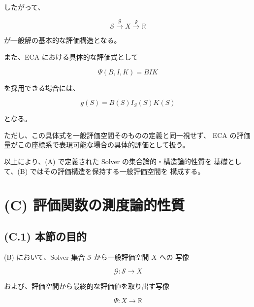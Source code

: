 \documentclass[a4paper,11pt]{article}
\newcommand{\Solver}{\mathcal{S}}
\newcommand{\R}{\mathbb{R}}
\begin{document}
したがって、

\begin{equation}
    \boxed{
        \Solver
        \xrightarrow{\mathcal{G}}
        X
        \xrightarrow{\Psi}
        \R
    }
\end{equation}

が一般解の基本的な評価構造となる。

また、ECA における具体的な評価式として

\begin{equation}
    \Psi(B,I,K)=BIK
\end{equation}

を採用できる場合には、

\begin{equation}
    g(S)
    =
    B(S)I_S(S)K(S)
\end{equation}

となる。

ただし、この具体式を一般評価空間そのものの定義と同一視せず、
ECA の評価量がこの座標系で表現可能な場合の具体的評価として扱う。

以上により、(A) で定義された Solver の集合論的・構造論的性質を
基礎として、(B) ではその評価構造を保持する一般評価空間を
構成する。


\section{(C) 評価関数の測度論的性質}
\label{sec:C}

\subsection{(C.1) 本節の目的}
\label{subsec:C1}

(B) において、Solver 集合 $\Solver$ から一般評価空間 $X$ への
写像

\begin{equation}
    \mathcal{G}:
    \Solver
    \longrightarrow
    X
\end{equation}

および、評価空間から最終的な評価値を取り出す写像

\begin{equation}
    \Psi:
    X
    \longrightarrow
    \R
\end{equation}
\end{document}
